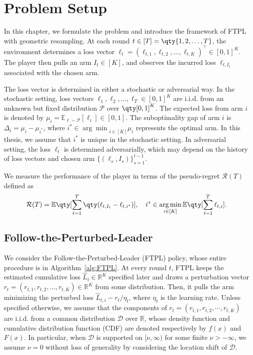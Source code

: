 \section{Problem Setup}

In this chapter, we formulate the problem and introduce the framework of FTPL with geometric resampling. At each round $t\in\left[T\right]=\qty{1,2,\dots,T}$, the environment determines a loss vector $\ell_t = (\ell_{t,1}, \ell_{t,2}, \ldots, \ell_{t,K})^\top \in [0,1]^K$. The player then pulls an arm $I_t\in\left[K\right]$, and observes the incurred loss $\ell_{t,I_t}$ associated with the chosen arm.

The loss vector is determined in either a stochastic or adversarial way. In the stochastic setting,
loss vectors $\ell_1, \ell_2, \ldots, \ell_T \in [0,1]^K$ are i.i.d. from an unknown but fixed distribution $\mathcal{P}$ over $\qty[0,1]^K$. The expected loss from arm $i$ is denoted by $\mu_i=\mathbb{E}_{\ell \sim \mathcal{P}}\left[\ell_i\right]\in\left[0,1\right]$. The suboptimality gap of arm $i$ is $\Delta_i=\mu_i-\mu_{i^*}$, where $i^*\in{\arg\min}_{i\in\left[K\right]}\mu_i$ represents the optimal arm.
In this thesis, we assume that $i^*$ is unique in the stochastic setting.
In adversarial setting, the loss $\ell_t$ is determined adversarially, which may depend on the history of loss vectors and chosen arm $\{\left(\ell_s,I_s\right)\}_{s=1}^{t-1}$.

We measure the performance of the player in terms of the pseudo-regret $\mathcal{R}(T)$ defined as
\begin{align*}
    \mathcal{R}(T) = \mathbb{E} \qty[ \sum_{t=1}^T \qty( \ell_{t, I_t} - \ell_{t, i^*} )],\quad
i^* \in \mathop{\arg\min}\limits_{i \in [K]} \mathbb{E} \qty[ \sum_{t=1}^T \ell_{t, i}].
\end{align*}

\subsection{Follow-the-Perturbed-Leader}
We consider the Follow-the-Perturbed-Leader (FTPL) policy,
whose entire procedure is in Algorithm~\ref{alg:FTPL}.
At every round $t$, FTPL keeps the estimated cumulative loss $\hat{L}_t\in\mathbb{R}^K$ specified later
and draws a perturbation vector $r_t=(r_{t,1}, r_{t,2},\dots,r_{t,K})\in\mathbb{R}^K$ from some distribution.
Then, it pulls the arm minimizing the perturbed loss $\hat{L}_{t,i}-r_t/\eta_t$,
where $\eta_t$ is the learning rate.
Unless specified otherwise, we assume that the components of $r_t= (r_{t,1}, r_{t,2}, \cdots, r_{t,K})$ are i.i.d. from
a common distribution $\mathcal{D}$ over $\mathbb{R}$,
whose density function and cumulative distribution function (CDF) are denoted respectively by $f(x)$ and $F(x)$.
In particular,
when $\mathcal{D}$ is supported on $[\nu,\infty)$ for some finite $\nu>-\infty$, we assume $\nu=0$ without loss of generality
by considering the location shift of $\mathcal{D}$.

